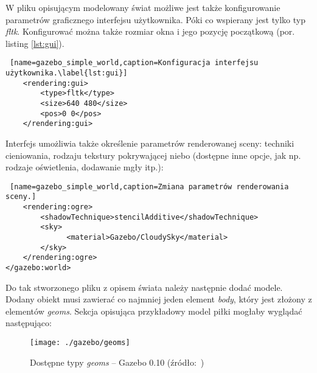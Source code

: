 	W pliku opisującym modelowany świat możliwe jest także konfigurowanie parametrów graficznego interfejsu użytkownika. Póki co wspierany jest tylko typ \textit{fltk}. Konfigurować można także rozmiar okna i jego pozycję początkową
	(por. listing \ref{lst:gui}).
\begin{lstlisting} [name=gazebo_simple_world,caption=Konfiguracja interfejsu użytkownika.\label{lst:gui}]
    <rendering:gui>
        <type>fltk</type>
        <size>640 480</size>
        <pos>0 0</pos>
    </rendering:gui>
\end{lstlisting}
	Interfejs umożliwia także określenie parametrów renderowanej sceny: techniki cieniowania, rodzaju tekstury pokrywającej niebo (dostępne inne opcje, jak np. rodzaje oświetlenia, dodawanie mgły itp.):
\begin{lstlisting} [name=gazebo_simple_world,caption=Zmiana parametrów renderowania sceny.]
    <rendering:ogre>
        <shadowTechnique>stencilAdditive</shadowTechnique>
        <sky>
              <material>Gazebo/CloudySky</material>
        </sky>
    </rendering:ogre>
</gazebo:world>
\end{lstlisting}

	Do tak stworzonego pliku z opisem świata należy następnie dodać modele.  Dodany obiekt musi zawierać co najmniej jeden element \textit{body}, który jest złożony z elementów \textit{geoms}. Sekcja opisująca przykładowy model piłki mogłaby wyglądać następująco:
	\begin{figure}[h]
	\centering
	\texttt{[image: ./gazebo/geoms]}
	\caption[Dostępne typy \textit{geoms}]
		{\label{fig:geoms}Dostępne typy \textit{geoms} -- Gazebo 0.10 (źródło:~\cite{gazebo_experts})}
	\end{figure}
	
